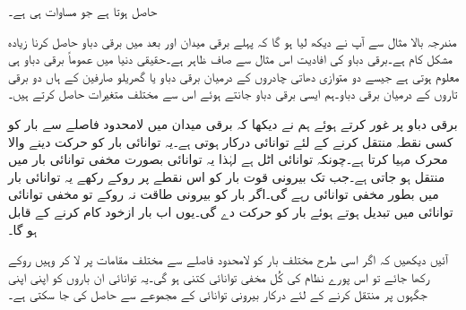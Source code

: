 حاصل ہوتا ہے جو مساوات  ہی ہے۔

مندرجہ بالا مثال سے آپ نے دیکھ لیا ہو گا کہ پہلے برقی میدان اور بعد میں برقی دباو حاصل کرنا زیادہ مشکل کام ہے۔برقی دباو کی افادیت  اس مثال سے صاف ظاہر ہے۔حقیقی دنیا میں عموماً برقی دباو ہی  معلوم ہوتی ہے جیسے دو متوازی دھاتی چادروں کے درمیان برقی دباو یا گھریلو صارفین کے ہاں دو برقی تاروں کے درمیان برقی دباو۔ہم ایسی برقی دباو جانتے ہوئے اس سے مختلف متغیرات حاصل کرتے ہیں۔ 

برقی دباو پر غور کرتے ہوئے ہم نے دیکھا کہ برقی میدان میں لامحدود فاصلے سے بار کو کسی نقطہ منتقل کرنے کے لئے توانائی درکار ہوتی ہے۔یہ توانائی بار کو حرکت دینے والا محرک مہیا کرتا ہے۔چونکہ توانائی اٹل ہے لہٰذا یہ توانائی بصورت مخفی توانائی بار میں منتقل ہو جاتی ہے۔جب تک بیرونی قوت بار کو اس نقطے پر روکے رکھے یہ توانائی بار میں بطور مخفی توانائی رہے گی۔اگر بار کو بیرونی طاقت نہ روکے تو مخفی توانائی  توانائی میں تبدیل ہوتے ہوئے بار کو حرکت دے گی۔یوں اب بار ازخود کام کرنے کے قابل ہو گا۔

آئیں دیکھیں کہ اگر اسی طرح مختلف بار کو لامحدود فاصلے سے مختلف مقامات پر لا کر وہیں روکے رکھا جائے تو اس پورے نظام کی کُل مخفی توانائی کتنی ہو گی۔یہ توانائی ان باروں کو اپنی اپنی  جگہوں پر منتقل کرنے کے لئے درکار بیرونی توانائی کے مجموعے سے حاصل کی جا سکتی ہے۔

